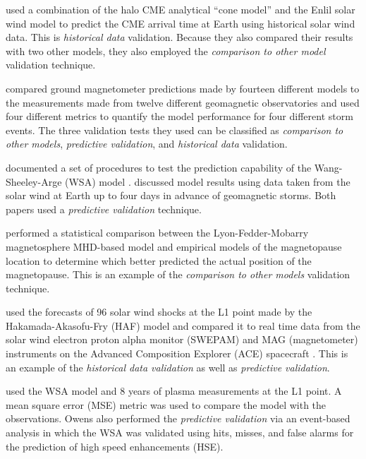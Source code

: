 \citet{Taktakishvili2009} used a combination of the halo CME analytical “cone
model” \citep{Xie2004} and the Enlil solar wind model \citep{Odstrcil2003}  to predict the CME arrival time at Earth using historical solar wind
data. This is \textit{historical data} validation. Because they also
compared their results with two other models, they also employed the
\textit{comparison to other model} validation technique.

\citet{Pulkkinen2011} compared ground magnetometer
predictions made by fourteen different models to the measurements made from
twelve different geomagnetic observatories and used four different metrics to quantify the model
performance for four different storm events. The three validation tests they
used can be classified as \textit{comparison to other models},
\textit{predictive validation}, and \textit{historical data} validation.

\citet{MacNeice2009a} documented a set of procedures to test the prediction
capability of the Wang-Sheeley-Arge (WSA) model \citep{Arge2003}.
\citet{MacNeice2009b} discussed model results using data taken from the
solar wind at Earth up to four days in advance of geomagnetic storms. Both
papers used a \textit{predictive validation} technique.

\citet{Garcia2007} performed a statistical comparison between the
Lyon-Fedder-Mobarry magnetosphere MHD-based model \citep{Lyon2004} and
empirical models of the magnetopause location to determine which better
predicted the actual position of the magnetopause. This is an example of the
\textit{comparison to other models} validation technique.

\citet{Mozer2003} used the forecasts of 96 solar wind shocks at the
L1 point made by the Hakamada-Akasofu-Fry (HAF) model \citep{Hakamada1982} and
compared it to real time data from the solar wind electron proton alpha monitor
(SWEPAM) and MAG (magnetometer) instruments on the Advanced Composition
Explorer (ACE) spacecraft \citep{Stone1998}. This is an example of the
\textit{historical data validation} as well as \textit{predictive
validation}.

\citet{Owens2005} used the WSA model and 8 years of plasma measurements at the
L1 point. A mean square error (MSE) metric was used to compare the model with
the observations. Owens also performed the \textit{predictive validation} via an
event-based analysis in which the WSA was validated using hits, misses, and
false alarms for the prediction of high speed enhancements (HSE).

